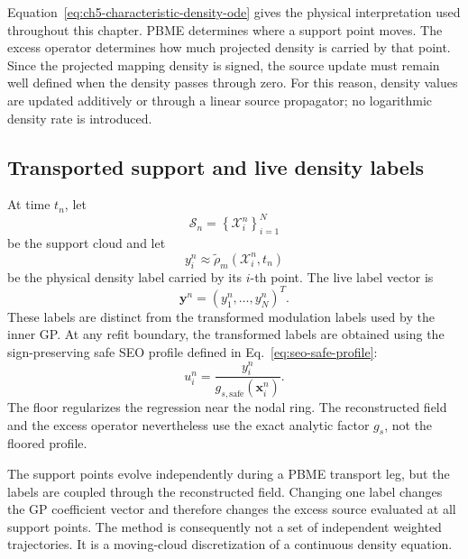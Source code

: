 \documentclass[
  11pt,
  letterpaper,
  onehalfspacing,
  normalmargins,
  equalmargins,
  oneside
]{ut-thesis}
\begin{document}
Equation~\eqref{eq:ch5-characteristic-density-ode} gives the physical
interpretation used throughout this chapter. PBME determines where a support
point moves. The excess operator determines how much projected density is
carried by that point. Since the projected mapping density is signed, the
source update must remain well defined when the density passes through zero.
For this reason, density values are updated additively or through a linear
source propagator; no logarithmic density rate is introduced.


\subsection{Transported support and live density labels}
\label{subsec:ch5-transported-support}

At time \(t_n\), let
\begin{equation}
\mathcal S_n
=
\left\{
\boldsymbol{\mathcal X}_i^n
\right\}_{i=1}^{N}
\label{eq:ch5-support-cloud}
\end{equation}
be the support cloud and let
\begin{equation}
 y_i^n
\approx
\tilde\rho_m
\left(\boldsymbol{\mathcal X}_i^n,t_n\right)
\label{eq:ch5-physical-labels}
\end{equation}
be the physical density label carried by its \(i\)-th point. The live label vector is
\begin{equation}
\mathbf y^n
=
\left(y_1^n,\ldots,y_N^n\right)^T.
\label{eq:ch5-label-vector}
\end{equation}
These labels are distinct from the transformed modulation labels used by the
inner GP. At any refit boundary, the transformed labels are obtained using the
sign-preserving safe SEO profile defined in
Eq.~\eqref{eq:seo-safe-profile}:
\begin{equation}
 u_i^n
=
\frac{y_i^n}
{g_{s,\mathrm{safe}}(\mathbf x_i^n)}.
\label{eq:ch5-modulation-labels}
\end{equation}
The floor regularizes the regression near the nodal ring. The reconstructed
field and the excess operator nevertheless use the exact analytic factor
\(g_s\), not the floored profile.

The support points evolve independently during a PBME transport leg, but the
labels are coupled through the reconstructed field. Changing one label changes
the GP coefficient vector and therefore changes the excess source evaluated at
all support points. The method is consequently not a set of independent
weighted trajectories. It is a moving-cloud discretization of a continuous
density equation.
\end{document}
